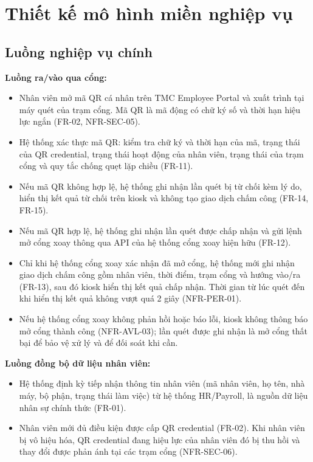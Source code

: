 \section{Thiết kế mô hình miền nghiệp vụ}\label{sec:domain-model}
\subsection{Luồng nghiệp vụ chính}\label{sec:business-flows}

\textbf{Luồng ra/vào qua cổng:}
\begin{itemize}
    \item Nhân viên mở mã QR cá nhân trên TMC Employee Portal và xuất trình tại máy quét của trạm cổng. Mã QR là mã động có chữ ký số và thời hạn hiệu lực ngắn (FR-02, NFR-SEC-05).
    \item Hệ thống xác thực mã QR: kiểm tra chữ ký và thời hạn của mã, trạng thái của QR credential, trạng thái hoạt động của nhân viên, trạng thái của trạm cổng và quy tắc chống quẹt lặp chiều (FR-11).
    \item Nếu mã QR không hợp lệ, hệ thống ghi nhận lần quét bị từ chối kèm lý do, hiển thị kết quả từ chối trên kiosk và không tạo giao dịch chấm công (FR-14, FR-15).
    \item Nếu mã QR hợp lệ, hệ thống ghi nhận lần quét được chấp nhận và gửi lệnh mở cổng xoay thông qua API của hệ thống cổng xoay hiện hữu (FR-12).
    \item Chỉ khi hệ thống cổng xoay xác nhận đã mở cổng, hệ thống mới ghi nhận giao dịch chấm công gồm nhân viên, thời điểm, trạm cổng và hướng vào/ra (FR-13), sau đó kiosk hiển thị kết quả chấp nhận. Thời gian từ lúc quét đến khi hiển thị kết quả không vượt quá 2 giây (NFR-PER-01).
    \item Nếu hệ thống cổng xoay không phản hồi hoặc báo lỗi, kiosk không thông báo mở cổng thành công (NFR-AVL-03); lần quét được ghi nhận là mở cổng thất bại để bảo vệ xử lý và để đối soát khi cần.
\end{itemize}

\textbf{Luồng đồng bộ dữ liệu nhân viên:}
\begin{itemize}
    \item Hệ thống định kỳ tiếp nhận thông tin nhân viên (mã nhân viên, họ tên, nhà máy, bộ phận, trạng thái làm việc) từ hệ thống HR/Payroll, là nguồn dữ liệu nhân sự chính thức (FR-01).
    \item Nhân viên mới đủ điều kiện được cấp QR credential (FR-02). Khi nhân viên bị vô hiệu hóa, QR credential đang hiệu lực của nhân viên đó bị thu hồi và thay đổi được phản ánh tại các trạm cổng (NFR-SEC-06).
\end{itemize}

